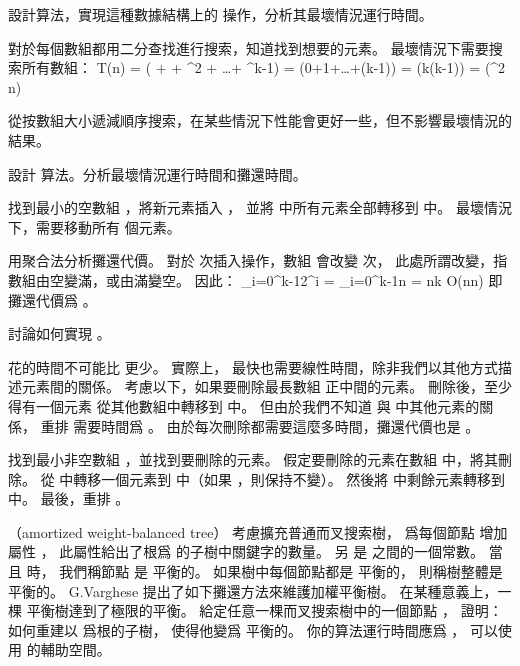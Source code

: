 \startigBase[a]
\startitem
設計算法，實現這種數據結構上的  操作，分析其最壞情況運行時間。
\stopitem

\startANSWER
對於每個數組都用二分查找進行搜索，知道找到想要的元素。
最壞情況下需要搜索所有數組：
\startformula\startmathalignment
\NC T(n) \NC = \Theta( +  + ^2 + \ldots + ^{k-1}) \NR
\NC \NC = \Theta(0+1+\ldots+(k-1)) \NR
\NC \NC = \Theta(k(k-1)) \NR
\NC \NC = \Theta(\lg^2 n) \NR
\stopmathalignment\stopformula

從按數組大小遞減順序搜索，在某些情況下性能會更好一些，但不影響最壞情況的結果。
\stopANSWER

\startitem
設計  算法。分析最壞情況運行時間和攤還時間。
\stopitem

\startANSWER
找到最小的空數組 ，將新元素插入 ，
並將  中所有元素全部轉移到  中。
最壞情況下，需要移動所有  個元素。

用聚合法分析攤還代價。
對於  次插入操作，數組  會改變  次，
此處所謂改變，指數組由空變滿，或由滿變空。
因此：
\startformula
\sum_{i=0}^{k-1}2^i = \sum_{i=0}^{k-1}n = nk \in O(n\lg n)
\stopformula
即攤還代價爲 。
\stopANSWER

\startitem
討論如何實現 。
\stopitem

\startANSWER
{} 花的時間不可能比  更少。
實際上，  最快也需要線性時間，除非我們以其他方式描述元素間的關係。
考慮以下，如果要刪除最長數組  正中間的元素。
刪除後，至少得有一個元素  從其他數組中轉移到  中。
但由於我們不知道  與  中其他元素的關係，
重排  需要時間爲 。
由於每次刪除都需要這麼多時間，攤還代價也是 。

找到最小非空數組 ，並找到要刪除的元素。
假定要刪除的元素在數組  中，將其刪除。
從  中轉移一個元素到  中（如果 ，則保持不變）。
然後將  中剩餘元素轉移到  中。
最後，重排 。
\stopANSWER
\stopigBase
\stopPROBLEM

\startPROBLEM
（amortized weight-balanced tree）
考慮擴充普通而叉搜索樹，
爲每個節點  增加屬性 ，
此屬性給出了根爲  的子樹中關鍵字的數量。
另 \m{\alpha} 是  之間的一個常數。
當  且  時，
我們稱節點  是 {\EMP \m{\alpha} 平衡的}。
如果樹中每個節點都是 \m{\alpha} 平衡的，
則稱樹整體是 {\EMP \m{\alpha} 平衡的}。
 G.Varghese 提出了如下攤還方法來維護加權平衡樹。
\startigBase[a]\startitem
在某種意義上，一棵  平衡樹達到了極限的平衡。
給定任意一棵而叉搜索樹中的一個節點 ，
證明：如何重建以  爲根的子樹，
使得他變爲  平衡的。
你的算法運行時間應爲 ，
可以使用  的輔助空間。
\stopitem\stopigBase

